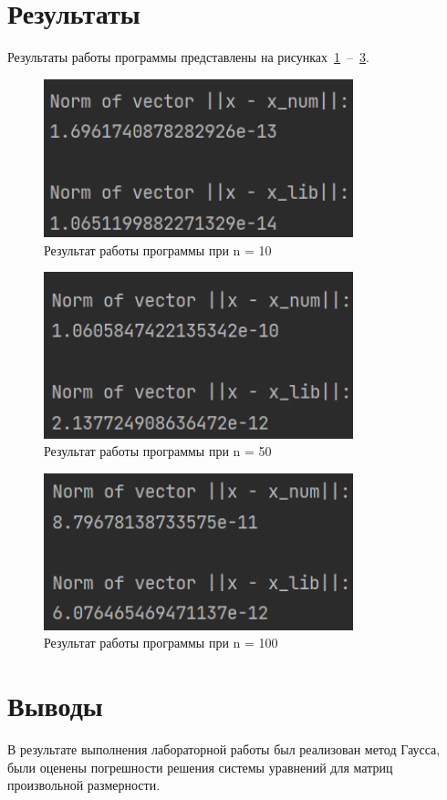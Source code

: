 \documentclass[a4paper, 14pt]{extarticle}
\begin{document}
\section{Результаты}\label{Sect::res}

Результаты работы программы представлены на рисунках~\ref{fig:img1}~--~\ref{fig:img3}.

\begin{figure}[!htb]
	\centering
	\includegraphics[width=0.8\textwidth]{img1}
\caption{Результат работы программы при n = 10}
\label{fig:img1}
\end{figure}

\begin{figure}[!htb]
	\centering
	\includegraphics[width=0.8\textwidth]{img2}
\caption{Результат работы программы при n = 50}
\label{fig:img2}
\end{figure}

\begin{figure}[!htb]
	\centering
	\includegraphics[width=0.8\textwidth]{img3}
\caption{Результат работы программы при n = 100}
\label{fig:img3}
\end{figure}

\section{Выводы}\label{Sect::conclusion}

В результате выполнения лабораторной работы был реализован метод Гаусса, были оценены погрешности решения системы уравнений для матриц произвольной размерности.
\end{document}
